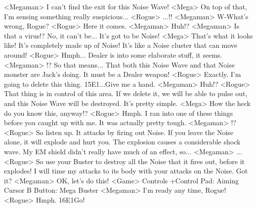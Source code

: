 <Megaman> I can't find the exit for this Noise Wave! 
<Mega> On top of that, I'm sensing something really suspicious... 
<Rogue> ...!! 
<Megaman> W-What's wrong, Rogue? 
<Rogue> Here it comes. 
<Megaman> Huh!? 
<Megaman> Is that a virus!? 
No, it can't be... It's got to be Noise! 
<Mega> That's what it looks like! It's completely made up of Noise! 
It's like a Noise cluster that can move around! 
<Rogue> Hmph... Dealer is into some elaborate stuff, it seems. 
<Megaman> !? 
So that means... 
That both this Noise Wave and that Noise monster are Jack's doing. 
It must be a Dealer weapon! 
<Rogue> Exactly. 
I'm going to delete this thing. {15}{E1}...Give me a hand. 
<Megaman> Huh!? 
<Rogue> That thing is in control of this area. 
If we delete it, we will be able to pulse out, and this Noise Wave will be destroyed. 
It's pretty simple. 
<Mega> How the heck do you know this, anyway!? 
<Rogue> Hmph. 
I ran into one of these things before you caught up with me. 
It was actually pretty tough. 
<Megaman> !? 
<Rogue> So listen up. 
It attacks by firing out Noise. 
If you leave the Noise alone, it will explode and hurt you. 
The explosion causes a considerable shock wave. 
My EM shield didn't really have much of an effect, so... 
<Megaman> ... 
<Rogue> So use your Buster to destroy all the Noise that 
it fires out, before it explodes! 
I will time my attacks to its body with your attacks on the Noise. 
Got it? 
<Megaman> OK, let's do this! 
<Game> Controls +Control Pad: Aiming Cursor B Button: Mega Buster 
<Megaman> I'm ready any time, Rogue! 
<Rogue> Hmph. {16}{E1}Go! 
